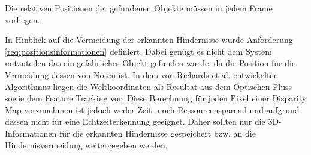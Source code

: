	\begin{anforderung}
	\label{req:positionsinformationen}
		Die relativen Positionen der gefundenen Objekte müssen in jedem Frame vorliegen.
	\end{anforderung}
	
In Hinblick auf die Vermeidung der erkannten Hindernisse wurde Anforderung \ref{req:positionsinformationen} definiert. Dabei genügt es nicht dem System mitzuteilen das ein gefährliches Objekt gefunden wurde, da die Position für die Vermeidung dessen von Nöten ist. In dem von Richards et al. \cite{richards2014obstacle} entwickelten Algorithmus liegen die Weltkoordinaten als Resultat aus dem Optischen Fluss sowie dem Feature Tracking vor. Diese Berechnung für jeden Pixel einer Disparity Map vorzunehmen ist jedoch weder Zeit- noch Ressourcensparend und aufgrund dessen nicht für eine Echtzeiterkennung geeignet. Daher sollten nur die 3D-Informationen für die erkannten Hindernisse gespeichert bzw. an die Hindernisvermeidung weitergegeben werden.

